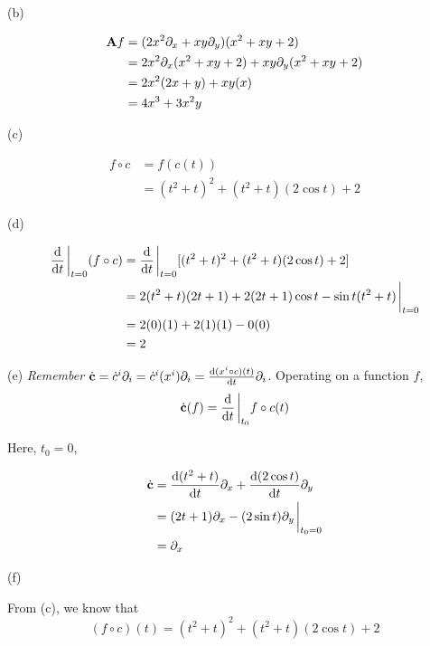 \documentclass[10pt]{article}
\begin{document}
\begin{enumerate}[start=1,label={\bfseries Exercise \arabic*:},leftmargin=1in]
        \noindent (b)

        \begin{align*}
            \vb{A}f &= (2x^2\partial_x + xy\partial_y)(x^2 + xy + 2) \\
                    &= 2x^2 \partial_x(x^2 + xy + 2) + xy \partial_y (x^2 + xy + 2) \\
                    &= 2x^2(2x+y) + xy(x) \\
                    &= 4x^3 + 3x^2y
        \end{align*}

        \noindent (c)

        \begin{align*}
            f \circ c &= f(c(t)) \\
                      &= (t^2 + t)^2 + (t^2 + t)(2\cos{t}) + 2
        \end{align*}

        \noindent (d)

        \begin{align*}
            \dv{t} \eval_{t=0} (f \circ c) &= \dv{t} \eval_{t=0} [(t^2 + t)^2 + (t^2 + t)(2\cos{t}) + 2 ] \\
                                                 &= 2(t^2 + t)(2t+1) + 2(2t+1)\cos{t} - \sin{t}(t^2 + t) \eval_{t=0} \\
                                                 &= 2(0)(1) + 2(1)(1) - 0(0) \\
                                                 &= 2
        \end{align*}

        \noindent (e) \emph{Remember} \(\dot{\vb{c}} = \dot{c}^i \partial_i = \dot{c}^i(x^i)\partial_i = \dv{(x^i \circ c)(t)}{t} \partial_i\). Operating on a function \(f\), \[\dot{\vb{c}}(f) = \dv{t}\eval_{t_0} f \circ c(t)\]

        \noindent Here, \(t_0 = 0\),


        \begin{align*}
              \dot{\vb{c}} &= \dv{(t^2+t)}{t} \partial_x + \dv{(2\cos{t})}{t} \partial_y \\
                           &= (2t+1)\partial_x - (2\sin{t})\partial_y \eval_{t_0=0} \\
                           &= \partial_x
        \end{align*}


        \noindent (f)

        \noindent From (c), we know that \[(f\circ c) (t) = (t^2+t)^2 + (t^2+t)(2\cos{t}) + 2 \]


\end{enumerate}
\end{document}

